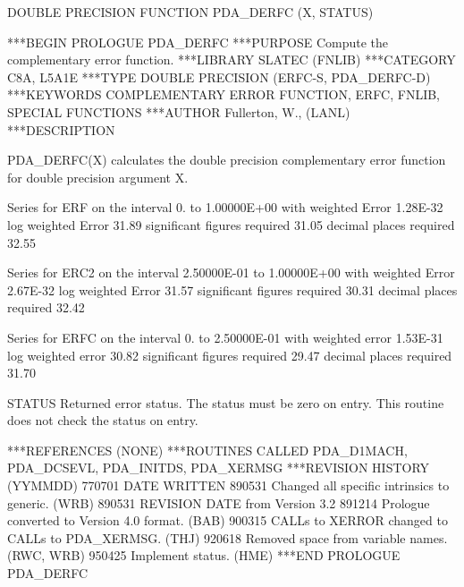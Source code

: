 \documentclass[11pt,twoside,nolof]{starlink}
\begin{document}


\begin{terminalv}
      DOUBLE PRECISION FUNCTION PDA_DERFC (X, STATUS)


***BEGIN PROLOGUE  PDA_DERFC
***PURPOSE  Compute the complementary error function.
***LIBRARY   SLATEC (FNLIB)
***CATEGORY  C8A, L5A1E
***TYPE      DOUBLE PRECISION (ERFC-S, PDA_DERFC-D)
***KEYWORDS  COMPLEMENTARY ERROR FUNCTION, ERFC, FNLIB,
             SPECIAL FUNCTIONS
***AUTHOR  Fullerton, W., (LANL)
***DESCRIPTION

 PDA_DERFC(X) calculates the double precision complementary error function
 for double precision argument X.

 Series for ERF        on the interval  0.          to  1.00000E+00
                                        with weighted Error   1.28E-32
                                         log weighted Error  31.89
                               significant figures required  31.05
                                    decimal places required  32.55

 Series for ERC2       on the interval  2.50000E-01 to  1.00000E+00
                                        with weighted Error   2.67E-32
                                         log weighted Error  31.57
                               significant figures required  30.31
                                    decimal places required  32.42

 Series for ERFC       on the interval  0.          to  2.50000E-01
                                        with weighted error   1.53E-31
                                         log weighted error  30.82
                               significant figures required  29.47
                                    decimal places required  31.70

    STATUS   Returned error status.
             The status must be zero on entry. This
             routine does not check the status on entry.

***REFERENCES  (NONE)
***ROUTINES CALLED  PDA_D1MACH, PDA_DCSEVL, PDA_INITDS, PDA_XERMSG
***REVISION HISTORY  (YYMMDD)
   770701  DATE WRITTEN
   890531  Changed all specific intrinsics to generic.  (WRB)
   890531  REVISION DATE from Version 3.2
   891214  Prologue converted to Version 4.0 format.  (BAB)
   900315  CALLs to XERROR changed to CALLs to PDA_XERMSG.  (THJ)
   920618  Removed space from variable names.  (RWC, WRB)
   950425  Implement status.  (HME)
***END PROLOGUE  PDA_DERFC
\end{terminalv}
\end{document}
